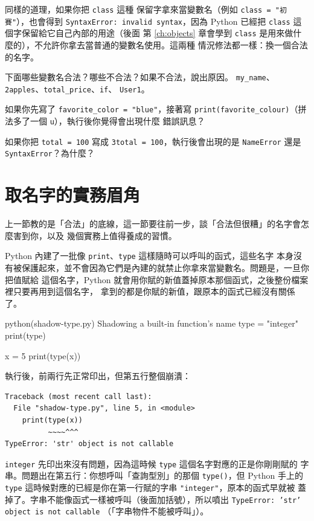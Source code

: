 同樣的道理，如果你把 \texttt{class} 這種
保留字拿來當變數名（例如 \texttt{class = "初賽"}），也會得到 \texttt{SyntaxError:
invalid syntax}，因為 Python 已經把 \texttt{class} 這個字保留給它自己內部的用途（後面
第 \ref{ch:objects} 章會學到 \texttt{class} 是用來做什麼的），不允許你拿去當普通的變數名使用。這兩種
情況修法都一樣：換一個合法的名字。

\begin{drills}[label=drills:variable-naming]
\item 下面哪些變數名合法？哪些不合法？如果不合法，說出原因。
\texttt{my\_name}、\texttt{2apples}、\texttt{total\_price}、\texttt{if}、
\texttt{User1}。
\item 如果你先寫了 \texttt{favorite\_color = "blue"}，接著寫
\texttt{print(favorite\_colour)}（拼法多了一個 \texttt{u}），執行後你覺得會出現什麼
錯誤訊息？
\item 如果你把 \texttt{total = 100} 寫成 \texttt{3total = 100}，執行後會出現的是
\texttt{NameError} 還是 \texttt{SyntaxError}？為什麼？
\end{drills}

\section{取名字的實務眉角}
\label{sec:naming-practices}

上一節教的是「合法」的底線，這一節要往前一步，談「合法但很糟」的名字會怎麼害到你，以及
幾個實務上值得養成的習慣。

Python 內建了一批像 \texttt{print}、\texttt{type} 這樣隨時可以呼叫的函式，這些名字
本身沒有被保護起來，並不會因為它們是內建的就禁止你拿來當變數名。問題是，一旦你把值賦給
這個名字，Python 就會用你賦的新值蓋掉原本那個函式，之後整份檔案裡只要再用到這個名字，
拿到的都是你賦的新值，跟原本的函式已經沒有關係了。

\begin{example}{python}{(shadow-type.py) Shadowing a built-in function's name}
type = "integer"
print(type)

x = 5
print(type(x))
\end{example}

執行後，前兩行先正常印出，但第五行整個崩潰：

\begin{verbatim}
Traceback (most recent call last):
  File "shadow-type.py", line 5, in <module>
    print(type(x))
          ~~~~^^^
TypeError: 'str' object is not callable
\end{verbatim}

\texttt{integer} 先印出來沒有問題，因為這時候 \texttt{type} 這個名字對應的正是你剛剛賦的
字串。問題出在第五行：你想呼叫「查詢型別」的那個 \texttt{type()}，但 Python 手上的
\texttt{type} 這時候對應的已經是你在第一行賦的字串 \texttt{"integer"}，原本的函式早就被
蓋掉了。字串不能像函式一樣被呼叫（後面加括號），所以噴出 \texttt{TypeError: 'str'
object is not callable}
（「字串物件不能被呼叫」）。

